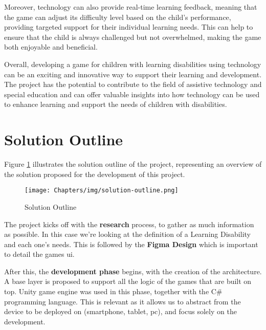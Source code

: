 Moreover, technology can also provide real-time learning feedback, meaning that the game can adjust its difficulty level based on the child's performance, providing targeted support for their individual learning needs. This can help to ensure that the child is always challenged but not overwhelmed, making the game both enjoyable and beneficial.

Overall, developing a game for children with learning disabilities using technology can be an exciting and innovative way to support their learning and development. The project has the potential to contribute to the field of assistive technology and special education and can offer valuable insights into how technology can be used to enhance learning and support the needs of children with disabilities.

\section{Solution Outline}

Figure \ref{fig:solutionOutline} illustrates the solution outline of the project, representing an overview of the solution proposed for the development of this project.

\begin{figure}[H]
    \centering
    \texttt{[image: Chapters/img/solution-outline.png]}
    \caption{Solution Outline}
    \label{fig:solutionOutline}
\end{figure}

The project kicks off with the \textbf{research} process, to gather as much information as possible. In this case we're looking at the definition of a Learning Disability and each one's needs.
This is followed by the \textbf{Figma Design} which is important to detail the games \gls{ui}.

After this, the \textbf{development phase} begins, with the creation of the architecture. A base layer is proposed to support all the logic of the games that are built on top. Unity game engine was used in this phase, together with the C\# programming language. This is relevant as it allows us to abstract from the device to be deployed on (smartphone, tablet, pc), and focus solely on the development.


